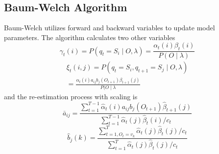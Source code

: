 \documentclass[twoside]{article}
\begin{document}
\begin{multicols}{2}
\subsection{Baum-Welch Algorithm}
Baum-Welch utilizes forward and backward variables to update model parameters. The algorithm calculates two other variables
\begin{equation}
\gamma_t(i) = P(q_t = S_i\mid O, \lambda) = \frac{\alpha_t(i)\beta_t(i)}{P(O\mid\lambda)}
\end{equation}
\begin{multline}
\xi_t(i,j) = P(q_t = S_i, q_{t+1} = S_j\mid O, \lambda) \\
= \frac{\alpha_t(i)a_{ij}b_j(O_{t+1})\beta_{t+1}(j)}{P(O\mid\lambda}
\end{multline}
and the re-estimation process with scaling is
\begin{equation}
\bar{a}_{ij} = \frac{\sum_{t=1}^{T-1}\hat{\alpha}_t(i)a_{ij}b_j(O_{t+1})
\hat{\beta}_{t+1}(j)}{\sum_{t=1}^{T-1}\hat{\alpha}_t(j)\hat{\beta}_t(i)/c_t}
\end{equation}
\begin{equation}
\hat{b}_j(k) = \frac{\sum_{t=1, O_t=v_k}^T \hat{\alpha}_t(j)\hat{\beta}_t(j)/c_t}{\sum_{t=1}^T\hat{\alpha}_t(j)\hat{\beta}_t(j)/c_t}
\end{equation}


\end{multicols}
\end{document}
